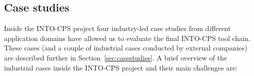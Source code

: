 

\subsection{Case studies}
Inside the INTO-CPS project four industry-led case studies from different application domains have allowed us to evaluate the final INTO-CPS tool chain. These cases (and a couple of industrial cases conducted by external companies) are described further in Section~\ref{sec:casestudies}. A brief overview of the industrial cases inside the INTO-CPS project and their main challenges are:


